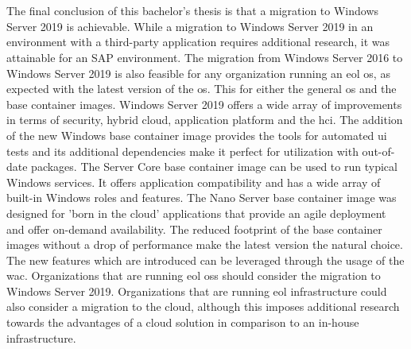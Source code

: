 \chapter{}
\label{ch:conclusie}
The final conclusion of this bachelor's thesis is that a migration to Windows Server 2019 is achievable.
While a migration to Windows Server 2019 in an environment with a third-party application requires additional research, it was attainable for an SAP environment. 
The migration from Windows Server 2016 to Windows Server 2019 is also feasible for any organization running an \acrshort{eol} \acrshort{os}, as expected with the latest version of the \acrshort{os}.
This for either the general \acrshort{os} and the base container images.
Windows Server 2019 offers a wide array of improvements in terms of security, hybrid cloud, application platform and the \acrfull{hci}.
The addition of the new Windows base container image provides the tools for automated \acrshort{ui} tests and its additional dependencies make it perfect for utilization with out-of-date packages. 
The Server Core base container image can be used to run typical Windows services. 
It offers application compatibility and has a wide array of built-in Windows roles and features. 
The Nano Server base container image was designed for 'born in the cloud' applications that provide an agile deployment and offer on-demand availability. 
The reduced footprint of the base container images without a drop of performance make the latest version the natural choice. 
The new features which are introduced can be leveraged through the usage of the \acrfull{wac}.
Organizations that are running \acrshort{eol} \acrlong{os}s should consider the migration to Windows Server 2019.
Organizations that are running \acrshort{eol} infrastructure could also consider a migration to the cloud, although this imposes additional research towards the advantages of a cloud solution in comparison to an in-house infrastructure.
